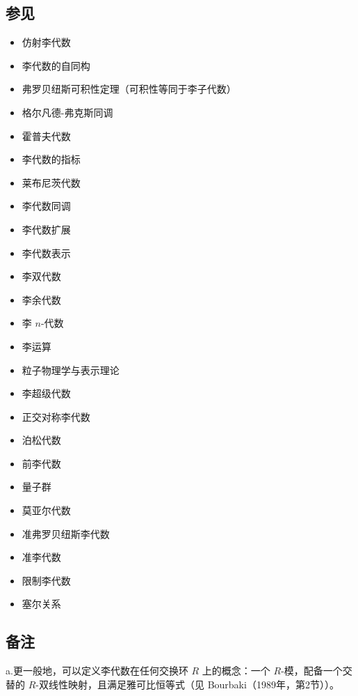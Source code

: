 \subsection{参见}
\begin{itemize}
\item 仿射李代数
\item 李代数的自同构
\item 弗罗贝纽斯可积性定理（可积性等同于李子代数）
\item 格尔凡德-弗克斯同调
\item 霍普夫代数
\item 李代数的指标
\item 莱布尼茨代数
\item 李代数同调
\item 李代数扩展
\item 李代数表示
\item 李双代数
\item 李余代数
\item 李 \( n \)-代数
\item 李运算
\item 粒子物理学与表示理论
\item 李超级代数
\item 正交对称李代数
\item 泊松代数
\item 前李代数
\item 量子群
\item 莫亚尔代数
\item 准弗罗贝纽斯李代数
\item 准李代数
\item 限制李代数
\item 塞尔关系
\end{itemize}
\subsection{备注}  
a.更一般地，可以定义李代数在任何交换环 \( R \) 上的概念：一个 \( R \)-模，配备一个交替的 \( R \)-双线性映射，且满足雅可比恒等式（见 Bourbaki（1989年，第2节））。
